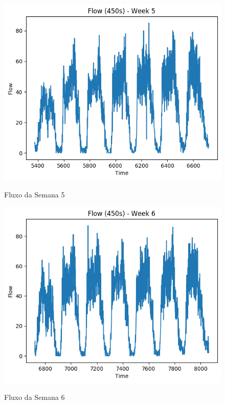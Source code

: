 \begin{figure}[h]
    \centering
    \includegraphics[scale=0.9]{monography/img/flows/flow_450_week_05.png}
    \label{figure:flow_450_week_05}
    \caption{Fluxo da Semana 5}
\end{figure}

\begin{figure}[h]
    \centering
    \includegraphics[scale=0.9]{monography/img/flows/flow_450_week_06.png}
    \label{figure:flow_450_week_06}
    \caption{Fluxo da Semana 6}
\end{figure}


